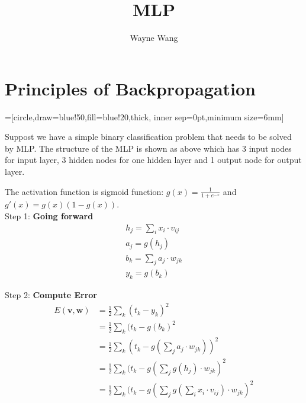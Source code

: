 \documentclass[UTF-8]{article}
\title{MLP}
\author{Wayne Wang}
\date{}
\begin{document}
\maketitle
\section{Principles of Backpropagation}

=[circle,draw=blue!50,fill=blue!20,thick,
inner sep=0pt,minimum size=6mm]
\begin{center}
\end{center}

Suppost we have a simple binary classification problem that
needs to be solved by MLP. The structure of the MLP is shown as
above which has 3 input nodes for input layer, 3 hidden nodes
for one hidden layer and 1 output node for output layer.

The activation function is sigmoid function:
$g(x)=\frac{1}{1+e^{-x}}$ and $g'(x)=g(x)(1-g(x))$.
\\

Step 1: \textbf{Going forward}
\begin{gather}
  h_j = \sum_i x_i\cdot v_{ij}\\
  a_j = g(h_j)\\
  b_k = \sum_j a_j\cdot w_{jk}\\
  y_k = g(b_k)
\end{gather}

Step 2: \textbf{Compute Error}
\begin{equation}
  \begin{split}
  E(\textbf{v},\textbf{w})
  &=\frac{1}{2} \sum_k (t_k-y_k)^2\\
  &=\frac{1}{2} \sum_k (t_k-g(b_k)^2\\
  &=\frac{1}{2} \sum_k (t_k-g(\sum_j a_j\cdot w_{jk}))^2\\
  &=\frac{1}{2} \sum_k (t_k-g(\sum_j g(h_j)\cdot w_{jk})^2\\
  &=\frac{1}{2} \sum_k (t_k-g(\sum_j g(\sum_i x_i\cdot v_{ij})\cdot w_{jk})^2\\
\end{split}
\end{equation}
\end{document}
